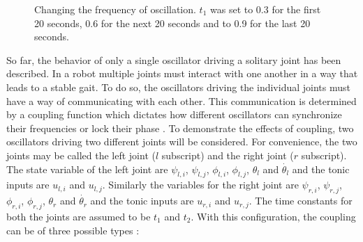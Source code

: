 \documentclass[12pt,twoside]{article}
\theoremstyle{plain}
\theoremstyle{definition}
\theoremstyle{remark}
\newcommand{\forceindent}{\leavevmode{\parindent=2em\indent}}
\begin{document}
\begin{figure}[H]
\centering     %
{}
\caption{Changing the frequency of oscillation. $t_1$ was set to 0.3 for the first 20 seconds, 0.6 for the next 20 seconds and to 0.9 for the last 20 seconds.}
\label{fig:change-freq}
\end{figure}


\forceindent So far, the behavior of only a single oscillator driving a solitary joint has been described. In a robot multiple joints must interact with one another in a way that leads to a stable gait. To do so, the oscillators driving the individual joints must have a way of communicating with each other. This communication is determined by a coupling function which dictates how different oscillators can synchronize their frequencies or lock their phase \cite{Ronsse2009}. To demonstrate the effects of coupling, two oscillators driving two different joints will be considered. For convenience, the two joints may be called the left joint ($l$ subscript) and the right joint ($r$ subscript). The state variable of the left joint are $\psi_{l,i}$, $\psi_{l,j}$, $\phi_{l,i}$, $\phi_{l,j}$, $\theta_l$ and $\dot{\theta_l}$ and the tonic inputs are $u_{l,i}$ and $u_{l,j}$. Similarly the variables for the right joint are $\psi_{r,i}$, $\psi_{r,j}$, $\phi_{r,i}$, $\phi_{r,j}$, $\theta_r$ and $\dot{\theta_r}$ and the tonic inputs are $u_{r,i}$ and $u_{r,j}$. The time constants for both the joints are assumed to be $t_1$ and $t_2$. With this configuration, the coupling can be of three possible types \cite{Ronsse2009}:
\end{document}
